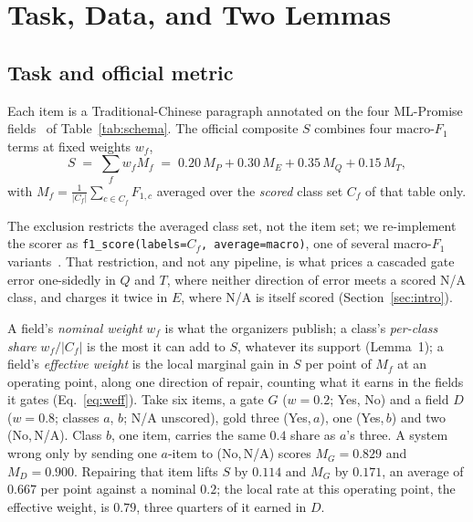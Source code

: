 \section{Task, Data, and Two Lemmas}
\label{sec:task}

\subsection{Task and official metric}
\label{sec:metric}

Each item is a Traditional-Chinese paragraph annotated on the four ML-Promise
fields~\cite{seki2025mlpromise,chen2025semeval} of Table~\ref{tab:schema}. The official composite
$S$ combines four macro-$F_1$ terms at fixed weights $w_f$,
\begin{equation}
S \;=\; \sum_{f} w_f M_f \;=\; 0.20\,M_{P} + 0.30\,M_{E} + 0.35\,M_{Q} + 0.15\,M_{T},
\label{eq:score}
\end{equation}
with $M_f=\frac{1}{|C_f|}\sum_{c\in C_f}F_{1,c}$ averaged over the \emph{scored} class set $C_f$
of that table only.

The exclusion restricts the averaged class set, not the item set; we re-implement the scorer as
\texttt{f1\_score(labels=$C_f$,\,average=macro)}, one of several macro-$F_1$
variants~\cite{opitz2019macro}. That restriction, and not any pipeline, is what prices a cascaded gate
error one-sidedly in $Q$ and $T$, where neither direction of error meets a scored N/A class, and
charges it twice in $E$, where N/A is itself scored (Section~\ref{sec:intro}).

 A field's \emph{nominal weight} $w_f$ is what the organizers
publish; a class's \emph{per-class share} $w_f/|C_f|$ is the most it can add to $S$, whatever its
support (Lemma~1); a field's \emph{effective weight} is the local marginal gain in $S$ per point of
$M_f$ at an operating point, along one direction of repair, counting what it earns in the fields
it gates (Eq.~\eqref{eq:weff}). Take six items, a gate $G$ ($w{=}0.2$; Yes, No) and a field $D$
($w{=}0.8$; classes $a$, $b$; N/A unscored), gold three (Yes,\,$a$), one (Yes,\,$b$) and two
(No,\,N/A). Class $b$, one item, carries the same $0.4$ share as $a$'s three. A system wrong only
by sending one $a$-item to (No,\,N/A) scores $M_G{=}0.829$ and $M_D{=}0.900$. Repairing that
item lifts $S$ by $0.114$ and $M_G$ by $0.171$, an average of $0.667$ per point against a nominal
$0.2$; the local rate at this operating point, the effective weight, is $0.79$, three quarters of
it earned in $D$.

